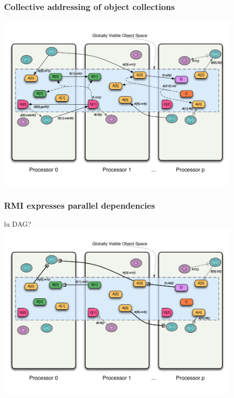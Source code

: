 \begin{frame}
\frametitle{Collective addressing of object collections}
	\begin{center}
        \includegraphics[width=0.9\textwidth]{../figures/progmodel/14-rmi-collective.pdf}
	\end{center}
\end{frame}


\begin{frame}
\frametitle{RMI expresses parallel dependencies}
	\begin{center}
        lu DAG?
        \includegraphics[width=0.9\textwidth]{../figures/progmodel/11-global-methods.pdf}
	\end{center}
\end{frame}



